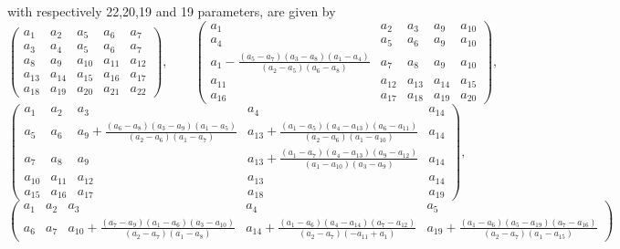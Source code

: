 \documentclass{article}
\begin{document}
\begin{enumerate}[1.]
with respectively 22,20,19 and 19 parameters, are given by
\[
\begin{pmatrix}
a_{1} & a_{2} & a_{5} & a_{6} & a_{7} 
\\
 a_{3} & a_{4} & a_{5} & a_{6} & a_{7} 
\\
 a_{8} & a_{9} & a_{10} & a_{11} & a_{12} 
\\
 a_{13} & a_{14} & a_{15} & a_{16} & a_{17} 
\\
 a_{18} & a_{19} & a_{20} & a_{21} & a_{22}
\end{pmatrix},\qquad
\begin{pmatrix}
a_{1} & a_{2} & a_{3} & a_{9} & a_{10} 
\\
 a_{4} & a_{5} & a_{6} & a_{9} & a_{10} 
\\
 a_{1}-\frac{\left(a_{5}-a_{7}\right) \left(a_{3}-a_{8}\right) \left(a_{1}-a_{4}\right)}{\left(a_{2}-a_{5}\right) \left(a_{6}-a_{8}\right)} & a_{7} & a_{8} & a_{9} & a_{10} 
\\
 a_{11} & a_{12} & a_{13} & a_{14} & a_{15} 
\\
 a_{16} & a_{17} & a_{18} & a_{19} & a_{20} 
\end{pmatrix},
\]
\[
\begin{pmatrix}
a_{1} & a_{2} & a_{3} & a_{4} & a_{14} 
\\
 a_{5} & a_{6} & a_{9}+\frac{\left(a_{6}-a_{8}\right) \left(a_{3}-a_{9}\right) \left(a_{1}-a_{5}\right)}{\left(a_{2}-a_{6}\right) \left(a_{1}-a_{7}\right)} & a_{13}+\frac{\left(a_{1}-a_{5}\right) \left(a_{4}-a_{13}\right) \left(a_{6}-a_{11}\right)}{\left(a_{2}-a_{6}\right) \left(a_{1}-a_{10}\right)} & a_{14} 
\\
 a_{7} & a_{8} & a_{9} & a_{13}+\frac{\left(a_{1}-a_{7}\right) \left(a_{4}-a_{13}\right) \left(a_{9}-a_{12}\right)}{\left(a_{1}-a_{10}\right) \left(a_{3}-a_{9}\right)} & a_{14} 
\\
 a_{10} & a_{11} & a_{12} & a_{13} & a_{14} 
\\
 a_{15} & a_{16} & a_{17} & a_{18} & a_{19} 
\end{pmatrix},
\]
\[
\begin{pmatrix}
a_{1} & a_{2} & a_{3} & a_{4} & a_{5} 
\\
 a_{6} & a_{7} & a_{10}+\frac{\left(a_{7}-a_{9}\right) \left(a_{1}-a_{6}\right) \left(a_{3}-a_{10}\right)}{\left(a_{2}-a_{7}\right) \left(a_{1}-a_{8}\right)} & a_{14}+\frac{\left(a_{1}-a_{6}\right) \left(a_{4}-a_{14}\right) \left(a_{7}-a_{12}\right)}{\left(a_{2}-a_{7}\right) \left(-a_{11}+a_{1}\right)} & a_{19}+\frac{\left(a_{1}-a_{6}\right) \left(a_{5}-a_{19}\right) \left(a_{7}-a_{16}\right)}{\left(a_{2}-a_{7}\right) \left(a_{1}-a_{15}\right)} 

\end{pmatrix}\]
\end{enumerate}
\end{document}
